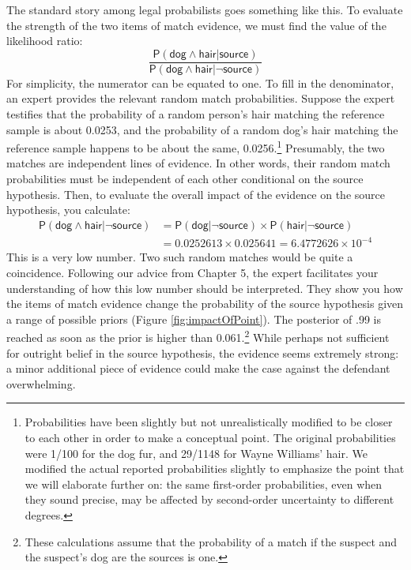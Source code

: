 \documentclass[
  10pt,
  dvipsnames,enabledeprecatedfontcommands]{scrartcl}
\newcommand{\pr}[1]{\mathsf{P}(#1)}
\newcommand{\s}[1]{\mbox{$\mathsf{#1}$}}
\begin{document}
The standard story among legal probabilists goes something like this. To
evaluate the strength of the two items of match evidence, we must find
the value of the likelihood ratio:
\[\frac{\pr{\s{dog}\wedge \s{hair} \vert \s{source}}}{\pr{\s{dog}\wedge \s{hair} \vert \neg \s{source}}}\]
For simplicity, the numerator can be equated to one. To fill in the
denominator, an expert provides the relevant random match probabilities.
Suppose the expert testifies that the probability of a random person's
hair matching the reference sample is about 0.0253, and the probability
of a random dog's hair matching the reference sample happens to be about
the same, 0.0256.\footnote{Probabilities have been slightly but not
  unrealistically modified to be closer to each other in order to make a
  conceptual point. The original probabilities were 1/100 for the dog
  fur, and 29/1148 for Wayne Williams' hair. We modified the actual
  reported probabilities slightly to emphasize the point that we will
  elaborate further on: the same first-order probabilities, even when
  they sound precise, may be affected by second-order uncertainty to
  different degrees.} Presumably, the two matches are independent lines
of evidence. In other words, their random match probabilities must be
independent of each other conditional on the source hypothesis. Then, to
evaluate the overall impact of the evidence on the source hypothesis,
you calculate: \begin{align*}
\pr{\s{dog}\wedge \s{hair} \vert \neg \s{source}} & = \pr{\s{dog} \vert \neg \s{source}} \times \pr{\s{hair} \vert \neg \s{source}} \\
& =  0.0252613 \times  0.025641 = \ensuremath{6.4772626\times 10^{-4}}
\end{align*} This is a very low number. Two such random matches would be
quite a coincidence. Following our advice from Chapter 5, the expert
facilitates your understanding of how this low number should be
interpreted. They show you how the items of match evidence change the
probability of the source hypothesis given a range of possible priors
(Figure \ref{fig:impactOfPoint}). The posterior of .99 is reached as
soon as the prior is higher than 0.061.\footnote{These calculations
  assume that the probability of a match if the suspect and the
  suspect's dog are the sources is one.} While perhaps not sufficient
for outright belief in the source hypothesis, the evidence seems
extremely strong: a minor additional piece of evidence could make the
case against the defendant overwhelming.
\end{document}
